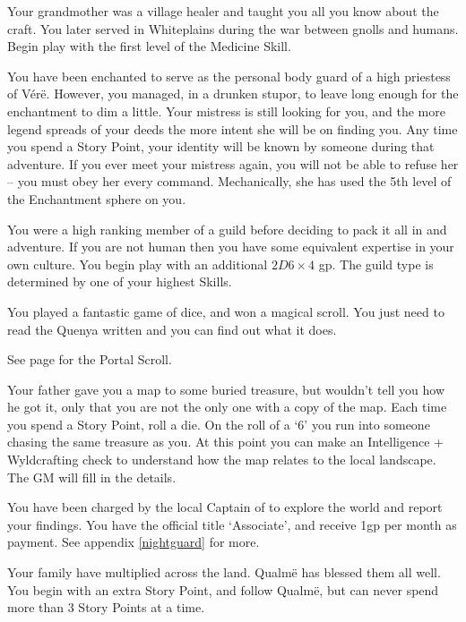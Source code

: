 \begin{multicols}{2}
\begin{list}{\addtocounter{list}{1}\textbf{:}}{\raggedleft}
  \item
  Your grandmother was a village healer and taught you all you know about the craft.
  You later served in Whiteplains during the war between gnolls and humans.
  Begin play with the first level of the Medicine Skill.

  \item
  You have been enchanted to serve as the personal body guard of a high priestess of V\'{e}r\"{e}.
  However, you managed, in a drunken stupor, to leave long enough for the enchantment to dim a little.
  Your mistress is still looking for you, and the more legend spreads of your deeds the more intent she will be on finding you.
  Any time you spend a Story Point, your identity will be known by someone during that adventure.
  If you ever meet your mistress again, you will not be able to refuse her -- you must obey her every command.
  Mechanically, she has used the 5th level of the Enchantment sphere on you.

  \item
  You were a high ranking member of a guild before deciding to pack it all in and adventure.
  If you are not human then you have some equivalent expertise in your own culture.
  You begin play with an additional $2D6\times4$ gp.
  The guild type is determined by one of your highest Skills.

  \item
  You played a fantastic game of dice, and won a magical scroll.
You just need to read the Quenya written and you can find out what it does.

See page \pageref{portalscroll} for the Portal Scroll.

  \item
  Your father gave you a map to some buried treasure, but wouldn't tell you how he got it, only that you are not the only one with a copy of the map.
  Each time you spend a Story Point, roll a die.
  On the roll of a `6' you run into someone chasing the same treasure as you.
  At this point you can make an Intelligence + Wyldcrafting check to understand how the map relates to the local landscape.
  The GM will fill in the details.

  \item
  You have been charged by the local Captain of  to explore the world and report your findings.
  You have the official title `Associate', and receive 1gp per month as payment.
  See appendix \ref{nightguard} for more.

\item
Your family have multiplied across the land.
Qualm\"e has blessed them all well.
You begin with an extra Story Point, and follow Qualm\"e, but can never spend more than 3 Story Points at a time.


\end{list}
\end{multicols}
